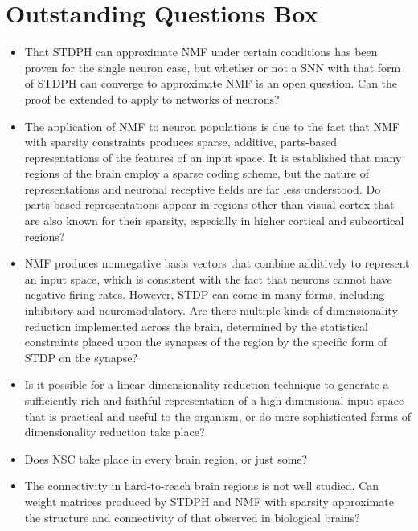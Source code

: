 \section{Outstanding Questions Box}



\begin{itemize}

\item That \ac{STDPH} can approximate \ac{NMF} under certain conditions has been proven for the single neuron case, but whether or not a  SNN with that form of \ac{STDPH} can converge to approximate \ac{NMF} is an open question. Can the proof be extended to apply to networks of neurons?

\item The application of \ac{NMF} to neuron populations is due to the fact that \ac{NMF} with sparsity constraints produces sparse, additive, parts-based representations of the features of an input space. It is established that many regions of the brain employ a sparse coding scheme, but the nature of representations and neuronal receptive fields are far less understood. Do parts-based representations appear in regions other than visual cortex that are also known for their sparsity, especially in higher cortical and subcortical regions?

\item \ac{NMF} produces nonnegative basis vectors that combine additively to represent an input space, which is consistent with the fact that neurons cannot have negative firing rates. However, \ac{STDP} can come in many forms, including inhibitory and neuromodulatory. Are there multiple kinds of dimensionality reduction implemented across the brain, determined by the statistical constraints placed upon the synapses of the region by the specific form of \ac{STDP} on the synapse?

\item Is it possible for a linear dimensionality reduction technique to generate a sufficiently rich and faithful representation of a high-dimensional input space that is practical and useful to the organism, or do more sophisticated forms of dimensionality reduction take place?

\item Does \ac{NSC} take place in every brain region, or just some? 

\item The connectivity in hard-to-reach brain regions is not well studied. Can weight matrices produced by \ac{STDPH} and \ac{NMF} with sparsity approximate the structure and connectivity of that observed in biological brains?

\end{itemize}